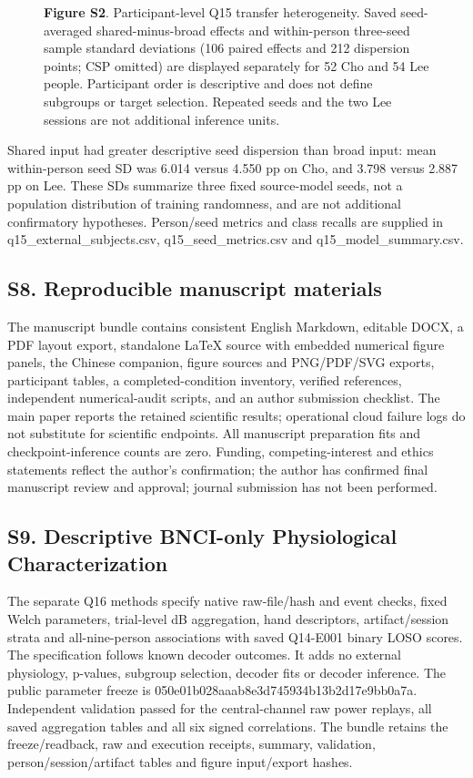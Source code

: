 \documentclass[11pt]{article}
\begin{document}
\begin{figure}[htbp]
{
}
\caption*{\textbf{Figure S2}. Participant-level Q15 transfer heterogeneity. Saved seed-averaged shared-minus-broad effects and within-person three-seed sample standard deviations (106 paired effects and 212 dispersion points; CSP omitted) are displayed separately for 52 Cho and 54 Lee people. Participant order is descriptive and does not define subgroups or target selection. Repeated seeds and the two Lee sessions are not additional inference units.}
\end{figure}
Shared input had greater descriptive seed dispersion than broad input: mean within-person seed SD was 6.014 versus 4.550 pp on Cho, and 3.798 versus 2.887 pp on Lee. These SDs summarize three fixed source-model seeds, not a population distribution of training randomness, and are not additional confirmatory hypotheses. Person/seed metrics and class recalls are supplied in q15\_external\_subjects.csv, q15\_seed\_metrics.csv and q15\_model\_summary.csv.

\subsection*{S8. Reproducible manuscript materials}
The manuscript bundle contains consistent English Markdown, editable DOCX, a PDF layout export, standalone LaTeX source with embedded numerical figure panels, the Chinese companion, figure sources and PNG/PDF/SVG exports, participant tables, a completed-condition inventory, verified references, independent numerical-audit scripts, and an author submission checklist. The main paper reports the retained scientific results; operational cloud failure logs do not substitute for scientific endpoints. All manuscript preparation fits and checkpoint-inference counts are zero. Funding, competing-interest and ethics statements reflect the author's confirmation; the author has confirmed final manuscript review and approval; journal submission has not been performed.

\subsection*{S9. Descriptive BNCI-only Physiological Characterization}
The separate Q16 methods specify native raw-file/hash and event checks, fixed Welch parameters, trial-level dB aggregation, hand descriptors, artifact/session strata and all-nine-person associations with saved Q14-E001 binary LOSO scores. The specification follows known decoder outcomes. It adds no external physiology, p-values, subgroup selection, decoder fits or decoder inference. The public parameter freeze is 050e01b028aaab8e3d745934b13b2d17e9bb0a7a. Independent validation passed for the central-channel raw power replays, all saved aggregation tables and all six signed correlations. The bundle retains the freeze/readback, raw and execution receipts, summary, validation, person/session/artifact tables and figure input/export hashes.
\end{document}
